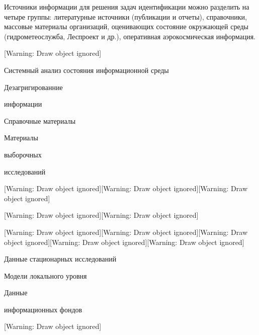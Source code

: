 \documentclass{report}
\begin{document}
 Источники информации для решения  задач  идентификации  можно разделить на четыре группы: литературные источники 
(публикации  и отчеты), справочники, массовые материалы организаций,  оценивающих состояние окружающей среды
(гидрометеослужба,  Леспроект  и  др.), оперативная аэрокосмическая информация.

[Warning: Draw object ignored]

\begin{center}
\begin{minipage}{12.957cm}
Системный  анализ  состояния  информационной  среды
\end{minipage}
\end{center}
\begin{center}
\begin{minipage}{3.863cm}
Дезагригированние 

информации
\end{minipage}
\end{center}
\begin{center}
\begin{minipage}{4.117cm}
Справочные материалы
\end{minipage}
\end{center}
\begin{center}
\begin{minipage}{3.863cm}
Материалы

выборочных

исследований
\end{minipage}
\end{center}
[Warning: Draw object ignored][Warning: Draw object ignored][Warning: Draw object ignored]

[Warning: Draw object ignored][Warning: Draw object ignored]

[Warning: Draw object ignored][Warning: Draw object ignored][Warning: Draw object ignored][Warning: Draw object
ignored][Warning: Draw object ignored]



\begin{center}
\begin{minipage}{4.117cm}
Данные стационарных исследований
\end{minipage}
\end{center}
\begin{center}
\begin{minipage}{3.863cm}
Модели локального уровня
\end{minipage}
\end{center}
\begin{center}
\begin{minipage}{3.863cm}
Данные 

информационных фондов
\end{minipage}
\end{center}
[Warning: Draw object ignored]
\end{document}
